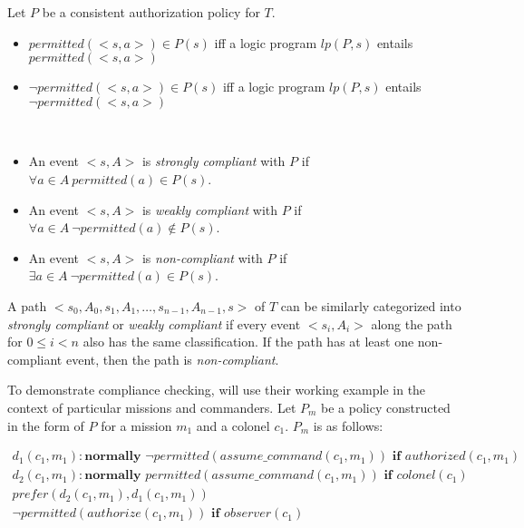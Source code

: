 \begin{definition}
    Let $P$ be a consistent authorization policy for $T$.

    \begin{itemize}
        \item $permitted(<s, a>) \in P(s)$ iff a logic program $lp(P, s)$ entails $permitted(<s,a>)$
        \item $\neg permitted(<s,a>) \in P(s)$ iff a logic program $lp(P, s)$ entails $\neg permitted(<s, a>)$
    \end{itemize}
\end{definition}

\begin{definition}
    ~

    \begin{itemize}
        \item An event $<s, A>$ is \textit{strongly compliant} with $P$ if $\forall a \in A\ permitted(a) \in P(s)$.
        \item An event $<s, A>$ is \textit{weakly compliant} with $P$ if $\forall a \in A\ \neg permitted(a) \not \in P(s)$.
        \item An event $<s, A>$ is \textit{non-compliant} with $P$ if $\exists a \in A\ \neg permitted(a) \in P(s)$.
    \end{itemize}
\end{definition}

\begin{definition}
    A path $<s_0, A_0, s_1, A_1, \dots, s_{n-1}, A_{n-1}, s>$ of $T$ can be similarly categorized into \textit{strongly compliant} or \textit{weakly compliant} if every event $<s_i, A_i>$ along the path for $0 \le i < n$ also has the same classification.
    If the path has at least one non-compliant event, then the path is \textit{non-compliant}.
\end{definition}

To demonstrate compliance checking, \citet{gelfond_authorization_2008} will use their working example in the context of particular missions and commanders.
Let $P_m$ be a policy constructed in the form of $P$ for a mission $m_1$ and a colonel $c_1$.
$P_m$ is as follows:

\begin{gather*}
    d_1(c_1, m_1): \textbf{normally } \neg permitted(assume\_command(c_1, m_1)) \textbf{ if } authorized(c_1, m_1) \\
    d_2(c_1, m_1): \textbf{normally } permitted(assume\_command(c_1, m_1)) \textbf{ if } colonel(c_1) \\
    prefer(d_2(c_1,m_1),d_1(c_1,m_1)) \\
    \neg permitted(authorize(c_1, m_1)) \textbf{ if } observer(c_1)
\end{gather*}

